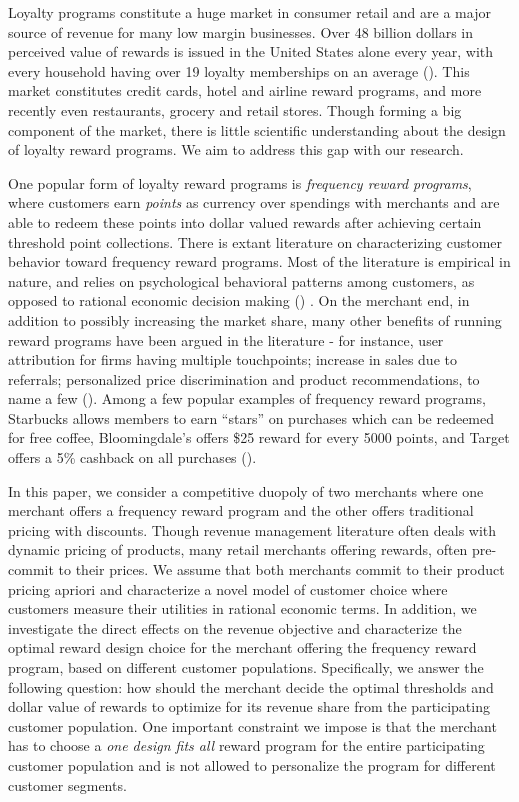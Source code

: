 Loyalty programs constitute a huge market in consumer retail and are a major source of revenue for many low margin businesses.
Over 48 billion dollars in perceived value of rewards is issued in the United States alone every year, with every household having over 19 loyalty memberships on an average (\cite{berry2013loyalty}).
This market constitutes credit cards, hotel and airline reward programs, and more recently even restaurants, grocery and retail stores.
Though forming a big component of the market, there is little scientific understanding about the design of loyalty reward programs. We aim to address this gap with our research.

One popular form of loyalty reward programs is \emph{frequency reward programs}, where customers earn \emph{points} as currency over spendings with merchants and are able to redeem these points into dollar valued rewards after achieving certain threshold point collections.
There is extant literature on characterizing customer behavior toward frequency reward programs.
Most of the literature is empirical in nature, and relies on psychological behavioral patterns among customers, as opposed to rational economic decision making (\cite{kivetz2006goal,dreze2004using,gao2014influence}) .
On the merchant end, in addition to possibly increasing the market share, many other benefits of running reward programs have been argued in the literature - for instance, user attribution for firms having multiple touchpoints; increase in sales due to referrals; personalized price discrimination and product recommendations, to name a few (\cite{ryu2007penny}).
Among a few popular examples of frequency reward programs, Starbucks allows members to earn ``stars'' on purchases which can be redeemed for free coffee, Bloomingdale's offers \$25 reward for every 5000 points, and Target offers a 5\% cashback on all purchases (\cite{cvs2015target}).

In this paper, we consider a competitive duopoly of two merchants where one merchant offers a frequency reward program and the other offers traditional pricing with discounts.
Though revenue management literature often deals with dynamic pricing of products, many retail merchants offering rewards, often pre-commit to their prices. 
We assume that both merchants commit to their product pricing apriori and characterize a novel model of customer choice where customers measure their utilities in rational economic terms.
In addition, we investigate the direct effects on the revenue objective and characterize the optimal reward design choice for the merchant offering the frequency reward program, based on different customer populations.
Specifically, we answer the following question: how should the merchant decide the optimal thresholds and dollar value of rewards to optimize for its revenue share from the participating customer population.
One important constraint we impose is that the merchant has to choose a \emph{one design fits all} reward program for the entire participating customer population and is not allowed to personalize the program for different customer segments.


